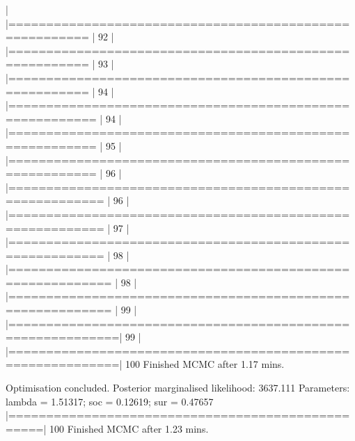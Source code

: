 \documentclass[article,nojss]{jss} %
\begin{document}
\begin{Schunk}
\begin{Soutput}
  |                                                                  
  |========================================================    |  92%
  |                                                                  
  |========================================================    |  93%
  |                                                                  
  |========================================================    |  94%
  |                                                                  
  |=========================================================   |  94%
  |                                                                  
  |=========================================================   |  95%
  |                                                                  
  |=========================================================   |  96%
  |                                                                  
  |==========================================================  |  96%
  |                                                                  
  |==========================================================  |  97%
  |                                                                  
  |==========================================================  |  98%
  |                                                                  
  |=========================================================== |  98%
  |                                                                  
  |=========================================================== |  99%
  |                                                                  
  |============================================================|  99%
  |                                                                  
  |============================================================| 100%
Finished MCMC after 1.17 mins.
\end{Soutput}
\end{Schunk}

\begin{Soutput}
Optimisation concluded.
Posterior marginalised likelihood: 3637.111
Parameters: lambda = 1.51317; soc = 0.12619; sur = 0.47657
  |==================================================| 100%
Finished MCMC after 1.23 mins.
\end{Soutput}
\end{document}
